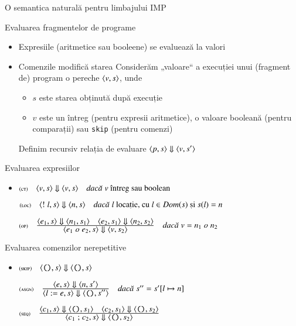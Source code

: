 \documentclass[xcolor=pdftex,romanian,colorlinks]{beamer}
\begin{document}
\begin{section}{O semantica naturală pentru limbajului IMP}
\begin{frame}{Evaluarea fragmentelor de programe}
\begin{itemize}
\item Expresiile (aritmetice sau booleene) se evaluează la valori
\item Comenzile modifică starea
\vitem Considerăm „valoare“ a execuției unui (fragment de) program o pereche ${\langle{v,s}\rangle}$, unde
\begin{itemize}
\item $s$ este starea obținută după execuție
\item $v$ este un întreg (pentru expresii aritmetice), o valoare booleană (pentru comparații) sau {\tt skip} (pentru comenzi)
\end{itemize}
\vitem Definim recursiv relația de evaluare $\displaystyle{\ensuremath {{\langle{p,s}\rangle}} \Downarrow {{\ensuremath \langle{v,s'}\rangle}}}$
\end{itemize}
\end{frame}

\begin{frame}{Evaluarea expresiilor}

\begin{itemize}
\item[] $\reg[ct]{\S{\c{v,s}}{\c{v,s}}}{}{v \mbox{ întreg sau boolean}}$

\vitem[]
$\reg[loc]{\S{\c{{\mathrel{!} l},s}}{\c{n,s}}}{}{l \mbox{ locație, cu $l\in Dom(s)$ și $s(l)=n$}}$

\vitem[]
$\reg[op]{\S{\c{e_1\mathrel{o} e_2,s}}{\c{v,s_2}}}{\S{\c{e_1,s}}{\c{n_1, s_1}}\si \S{\c{e_2,s_1}}{\c{n_2, s_2}}}{v = n_1 \mathrel{o} n_2}$

\end{itemize}

\end{frame}

\begin{frame}{Evaluarea comenzilor nerepetitive}

\begin{itemize}
\item[] $\reg[skip]{\S{\c{\Sskip,s}}{\c{\Sskip,s}}}{}{}$

\vitem[]
$\reg[asgn]{\S{\c{{l\mathrel{:=} e},s}}{\c{\Sskip,s''}}}{\S{\c{e,s}}{\c{n,s'}}}{s'' = s'[ l \mapsto n]}$

\vitem[]
$\reg[seq]{\S{\c{c_1\mathrel{;} c_2,s}}{\c{\Sskip,s_2}}}{\S{\c{c_1,s}}{\c{\Sskip, s_1}}\si \S{\c{c_2,s_1}}{\c{\Sskip, s_2}}}{}$


\end{itemize}
\end{frame}
\end{section}
\end{document}

